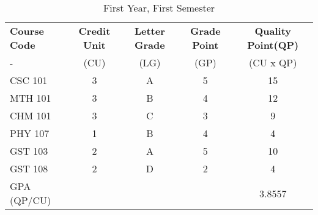 \documentclass{article}
\begin{document}
	
\begin{table}[h!]
 \begin{center}
 	\caption{First Year, First Semester}
 	\label{tab:table1}
 	\begin{tabular}{l|c|c|c|c}
 		\textbf{Course Code} & \textbf{Credit Unit} & 
 		\textbf{Letter Grade} &
 		\textbf{Grade Point} &
 		\textbf{Quality Point(QP)}\\
 		- & (CU) & (LG) & (GP) & (CU x QP)  \\
 		\hline
 		CSC 101 & 3 & A & 5 & 15\\
 		MTH 101 & 3 & B & 4 & 12\\
 		CHM 101 & 3 & C & 3 & 9\\
 		PHY 107 & 1 & B & 4 & 4\\
 		GST 103 & 2 & A & 5 & 10\\
 		GST 108 & 2 & D & 2 & 4\\
 		GPA (QP/CU) &  &  &  & 3.8557\\
 	\end{tabular}
 \end{center}
\end{table}
\end{document}
